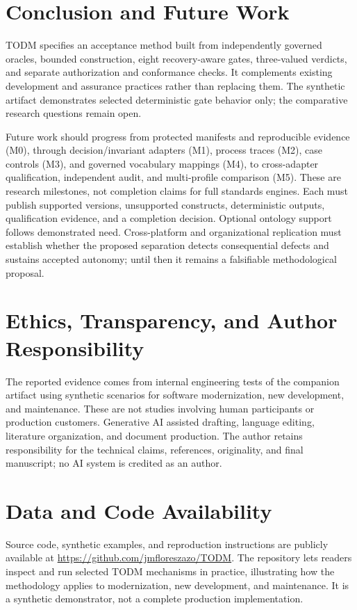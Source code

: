 \documentclass[11pt,a4paper]{article}
\begin{document}
\section{Conclusion and Future Work}\label{sec:conclusion}
TODM specifies an acceptance method built from independently governed oracles, bounded construction, eight recovery-aware gates, three-valued verdicts, and separate authorization and conformance checks. It complements existing development and assurance practices rather than replacing them. The synthetic artifact demonstrates selected deterministic gate behavior only; the comparative research questions remain open.

Future work should progress from protected manifests and reproducible evidence (M0), through decision/invariant adapters (M1), process traces (M2), case controls (M3), and governed vocabulary mappings (M4), to cross-adapter qualification, independent audit, and multi-profile comparison (M5). These are research milestones, not completion claims for full standards engines. Each must publish supported versions, unsupported constructs, deterministic outputs, qualification evidence, and a completion decision. Optional ontology support follows demonstrated need. Cross-platform and organizational replication must establish whether the proposed separation detects consequential defects and sustains accepted autonomy; until then it remains a falsifiable methodological proposal.

\section*{Ethics, Transparency, and Author Responsibility}
The reported evidence comes from internal engineering tests of the companion artifact using synthetic scenarios for software modernization, new development, and maintenance. These are not studies involving human participants or production customers. Generative AI assisted drafting, language editing, literature organization, and document production. The author retains responsibility for the technical claims, references, originality, and final manuscript; no AI system is credited as an author.

\section*{Data and Code Availability}
Source code, synthetic examples, and reproduction instructions are publicly available at \url{https://github.com/jmfloreszazo/TODM}. The repository lets readers inspect and run selected TODM mechanisms in practice, illustrating how the methodology applies to modernization, new development, and maintenance. It is a synthetic demonstrator, not a complete production implementation.



\end{document}
